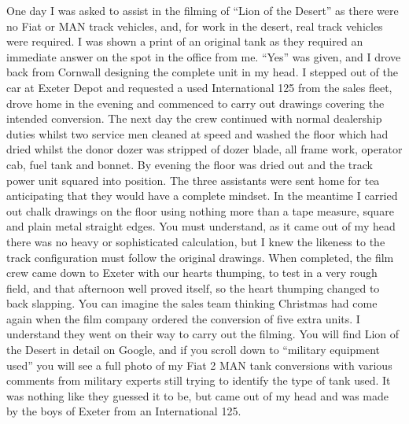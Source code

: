 One day I was asked to assist in the filming of ``Lion of the Desert'' as there
were no Fiat or MAN track vehicles, and, for work in the desert, real track
vehicles were required. I was shown a print of an original tank as they
required an immediate answer on the spot in the office from me. ``Yes'' was
given, and I drove back from Cornwall designing the complete unit in my head. I
stepped out of the car at Exeter Depot and requested a used International 125
from the sales fleet, drove home in the evening and commenced to carry out
drawings covering the intended conversion. The next day the crew continued with
normal dealership duties whilst two service men cleaned at speed and washed the
floor which had dried whilst the donor dozer was stripped of dozer blade, all
frame work, operator cab, fuel tank and bonnet. By evening the floor was dried
out and the track power unit squared into position. The three assistants were
sent home for tea anticipating that they would have a complete mindset. In the
meantime I carried out chalk drawings on the floor using nothing more than a
tape measure, square and plain metal straight edges. You must understand, as it
came out of my head there was no heavy or sophisticated calculation, but I knew
the likeness to the track configuration must follow the original drawings. When
completed, the film crew came down to Exeter with our hearts thumping, to test
in a very rough field, and that afternoon well proved itself, so the heart
thumping changed to back slapping. You can imagine the sales team thinking
Christmas had come again when the film company ordered the conversion of five
extra units. I understand they went on their way to carry out the filming. You
will find Lion of the Desert in detail on Google, and if you scroll down to
``military equipment used'' you will see a full photo of my Fiat 2 MAN tank
conversions with various comments from military experts still trying to
identify the type of tank used. It was nothing like they guessed it to be, but
came out of my head and was made by the boys of Exeter from an International
125.


